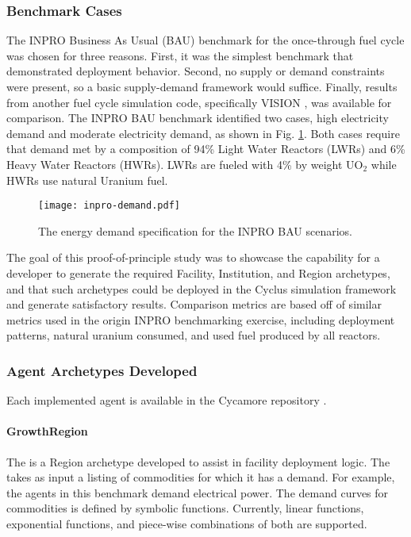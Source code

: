 \subsubsection{Benchmark Cases}

The INPRO Business As Usual (BAU) benchmark \cite{_international_2009} for the
once-through fuel cycle was chosen for three reasons. First, it was the simplest
benchmark that demonstrated deployment behavior. Second, no supply or demand
constraints were present, so a basic supply-demand framework would
suffice. Finally, results from another fuel cycle simulation code, specifically
VISION \cite{vision2009}, was available for comparison. The INPRO BAU benchmark
identified two cases, high electricity demand and moderate electricity demand,
as shown in Fig. \ref{fig:inpro-demand}. Both cases require that demand met by a
composition of 94\% Light Water Reactors (LWRs) and 6\% Heavy Water Reactors
(HWRs). LWRs are fueled with 4\% by weight UO$_2$ while HWRs use natural Uranium
fuel.

\begin{figure}
  \begin{center}
    \texttt{[image: inpro-demand.pdf]}
    \caption{The energy demand specification for the INPRO BAU scenarios.}
    \label{fig:inpro-demand}
  \end{center}  
\end{figure}

The goal of this proof-of-principle study was to showcase the capability for a
developer to generate the required Facility, Institution, and Region archetypes,
and that such archetypes could be deployed in the Cyclus simulation framework
and generate satisfactory results. Comparison metrics are based off of similar
metrics used in the origin INPRO benchmarking exercise, including deployment
patterns, natural uranium consumed, and used fuel produced by all reactors.

\subsubsection{Agent Archetypes Developed}

Each implemented agent is available in the Cycamore repository \cite{cycamore2013}.

\paragraph{GrowthRegion}

The  is a Region archetype developed to assist in
facility deployment logic. The  takes as input a listing of
commodities for which it has a demand. For example, the 
agents in this benchmark demand electrical power. The demand curves for
commodities is defined by symbolic functions. Currently, linear functions,
exponential functions, and piece-wise combinations of both are supported.


